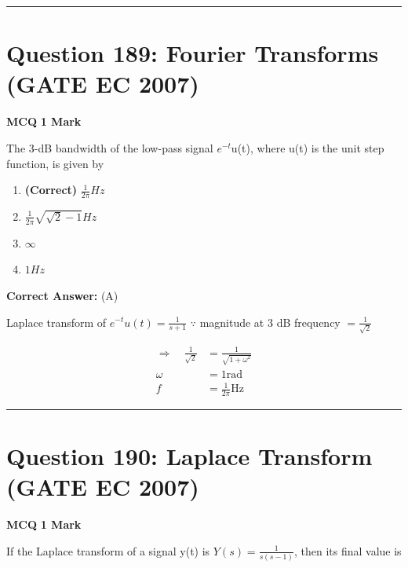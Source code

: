 \documentclass[11pt,a4paper]{article}
\begin{document}
\vspace{1.5em}
\hrule
\vspace{1.5em}

\section*{Question 189: Fourier Transforms (GATE EC 2007)}
\noindent \textbf{\color{primary}MCQ} \hfill \textbf{\color{secondary}1 Mark}


\noindent The 3-dB bandwidth of the low-pass signal $e^{-t}$u(t), where u(t) is the unit step function, is given by


\begin{enumerate}[label=(\Alph*)]
    \item \textbf{(Correct)} $\frac{1}{2\pi }Hz$
    \item $\frac{1}{2\pi }\sqrt{\sqrt{2}-1}Hz$
    \item $\infty$
    \item $1Hz$
\end{enumerate}

\noindent \textbf{Correct Answer:} (A)

\begin{tcolorbox}[solbox, title=Detailed Solution -- Question 189]
Laplace transform of $e^{-t} u(t)=\frac{1}{s+1}$
$\because$ magnitude at 3 dB frequency $=\frac{1}{\sqrt{2}}$

\[
\begin{aligned} \Rightarrow \quad \frac{1}{\sqrt{2}} &=\frac{1}{\sqrt{1+\omega^{2}}} \\ \omega &=1 \mathrm{rad} \\ f &=\frac{1}{2 \pi} \mathrm{Hz} \end{aligned}
\]
\end{tcolorbox}

\vspace{1.5em}
\hrule
\vspace{1.5em}

\section*{Question 190: Laplace Transform (GATE EC 2007)}
\noindent \textbf{\color{primary}MCQ} \hfill \textbf{\color{secondary}1 Mark}


\noindent If the Laplace transform of a signal y(t) is  $Y(s)=\frac{1}{s(s-1)}$, then its final value is
\end{document}
